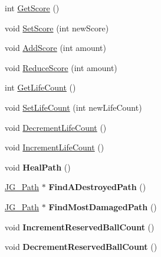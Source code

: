 \begin{DoxyCompactItemize}
\item 
int \hyperlink{class_j_g___game___main_afa38293cf043c824ccfa4aebe1e1545f}{Get\-Score} ()
\item 
void \hyperlink{class_j_g___game___main_a565135339ab0e993ace77fbfc8b39ab2}{Set\-Score} (int new\-Score)
\item 
void \hyperlink{class_j_g___game___main_af1018c29931a8569a468b0b7495ca5cc}{Add\-Score} (int amount)
\item 
void \hyperlink{class_j_g___game___main_a30a9fb93f7a2a61ce90ab1a77525c006}{Reduce\-Score} (int amount)
\item 
int \hyperlink{class_j_g___game___main_a666b141713d126df7e171fc68dd257a2}{Get\-Life\-Count} ()
\item 
void \hyperlink{class_j_g___game___main_a80e74d397b65b98182fb5c2054632899}{Set\-Life\-Count} (int new\-Life\-Count)
\item 
void \hyperlink{class_j_g___game___main_abffce98f5d7c28791aa13e4d081da6ec}{Decrement\-Life\-Count} ()
\item 
void \hyperlink{class_j_g___game___main_a529a8f577bb296cbbe9143f99ae26f1b}{Increment\-Life\-Count} ()
\item 
\hypertarget{class_j_g___game___main_a078d9577cbe6ee82bdb518d89f44bff2}{void {\bfseries Heal\-Path} ()}\label{class_j_g___game___main_a078d9577cbe6ee82bdb518d89f44bff2}

\item 
\hypertarget{class_j_g___game___main_aa55f5f3773c7471676052e0762225244}{\hyperlink{class_j_g___path}{J\-G\-\_\-\-Path} $\ast$ {\bfseries Find\-A\-Destroyed\-Path} ()}\label{class_j_g___game___main_aa55f5f3773c7471676052e0762225244}

\item 
\hypertarget{class_j_g___game___main_afc80360326818b771bd22b5dcf07f057}{\hyperlink{class_j_g___path}{J\-G\-\_\-\-Path} $\ast$ {\bfseries Find\-Most\-Damaged\-Path} ()}\label{class_j_g___game___main_afc80360326818b771bd22b5dcf07f057}

\item 
\hypertarget{class_j_g___game___main_a713822d4b987824df6d635698fb7cfb9}{void {\bfseries Increment\-Reserved\-Ball\-Count} ()}\label{class_j_g___game___main_a713822d4b987824df6d635698fb7cfb9}

\item 
\hypertarget{class_j_g___game___main_ada9e01460bcabf904a3f908190598f5b}{void {\bfseries Decrement\-Reserved\-Ball\-Count} ()}\label{class_j_g___game___main_ada9e01460bcabf904a3f908190598f5b}


\end{DoxyCompactItemize}
